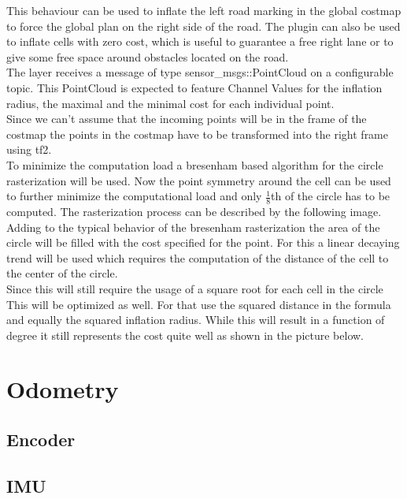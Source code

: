 This behaviour can be used to inflate the left road marking in the global costmap to force the global plan on the right side of the road. The plugin can also be used to inflate cells with zero cost, which is useful to guarantee a free right lane or to give some free space around obstacles located on the road.\\

The layer receives a message of type sensor\_msgs::PointCloud on a configurable topic. This PointCloud is expected to feature Channel Values for the inflation radius, the maximal and the minimal cost for each individual point.\\

Since we can't assume that the incoming points will be in the frame of the costmap the points in the costmap have to be transformed into the right frame using tf2.\\

To minimize the computation load a bresenham based algorithm for the circle rasterization will be used. Now the point symmetry around the cell can be used to further minimize the computational load and only $\frac{1}{8}$th of the circle has to be computed. The rasterization process can be described by the following image.\\

Adding to the typical behavior of the bresenham rasterization the area of the circle will be filled with the cost specified for the point. For this a linear decaying trend will be used which requires the computation of the distance of the cell to the center of the circle.\\ Since this will still require the usage of a square root for each cell in the circle This will be optimized as well. For that use the squared distance in the formula and equally the squared inflation radius. While this will result in a function of  degree it still represents the cost quite well as shown in the picture below.





\section{Odometry}
\subsection{Encoder}
\subsection{IMU}
